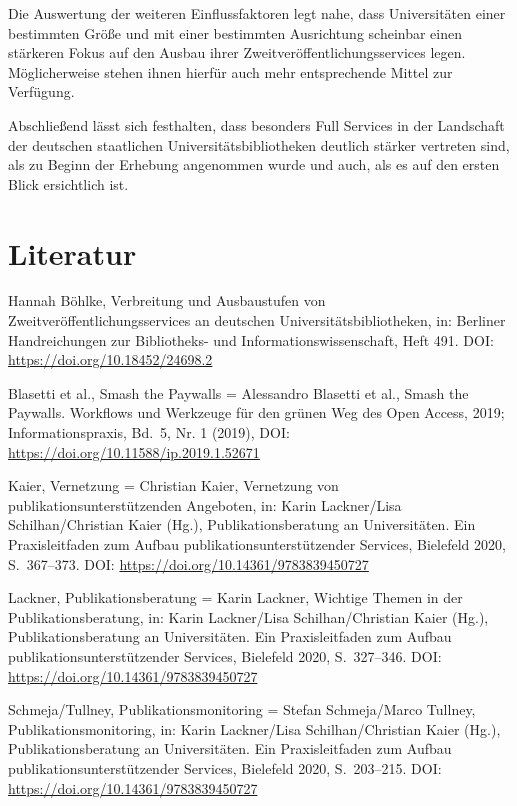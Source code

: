\documentclass[a4paper,
fontsize=11pt,
oneside,
numbers=noperiodatend,
parskip=half-,
bibliography=totoc,
final
]{scrartcl}
\begin{document}
Die Auswertung der weiteren Einflussfaktoren legt nahe, dass
Universitäten einer bestimmten Größe und mit einer bestimmten
Ausrichtung scheinbar einen stärkeren Fokus auf den Ausbau ihrer
Zweitveröffentlichungsservices legen. Möglicherweise stehen ihnen
hierfür auch mehr entsprechende Mittel zur Verfügung.

Abschließend lässt sich festhalten, dass besonders Full Services in der
Landschaft der deutschen staatlichen Universitätsbibliotheken deutlich
stärker vertreten sind, als zu Beginn der Erhebung angenommen wurde und
auch, als es auf den ersten Blick ersichtlich ist.

\hypertarget{literatur}{%
\section{Literatur}\label{literatur}}

Hannah Böhlke, Verbreitung und Ausbaustufen von
Zweitveröffentlichungsservices an deutschen Universitätsbibliotheken,
in: Berliner Handreichungen zur Bibliotheks- und
Informationswissenschaft, Heft 491. DOI:
\url{https://doi.org/10.18452/24698.2}

Blasetti et al., Smash the Paywalls = Alessandro Blasetti et al., Smash
the Paywalls. Workflows und Werkzeuge für den grünen Weg des Open
Access, 2019; Informationspraxis, Bd.~5, Nr. 1 (2019), DOI:
\url{https://doi.org/10.11588/ip.2019.1.52671}

Kaier, Vernetzung = Christian Kaier, Vernetzung von
publikationsunterstützenden Angeboten, in: Karin Lackner/Lisa
Schilhan/Christian Kaier (Hg.), Publikationsberatung an Universitäten.
Ein Praxisleitfaden zum Aufbau publikationsunterstützender Services,
Bielefeld 2020, S.~367--373. DOI:
\url{https://doi.org/10.14361/9783839450727}

Lackner, Publikationsberatung = Karin Lackner, Wichtige Themen in der
Publikationsberatung, in: Karin Lackner/Lisa Schilhan/Christian Kaier
(Hg.), Publikationsberatung an Universitäten. Ein Praxisleitfaden zum
Aufbau publikationsunterstützender Services, Bielefeld 2020,
S.~327--346. DOI: \url{https://doi.org/10.14361/9783839450727}

Schmeja/Tullney, Publikationsmonitoring = Stefan Schmeja/Marco Tullney,
Publikationsmonitoring, in: Karin Lackner/Lisa Schilhan/Christian Kaier
(Hg.), Publikationsberatung an Universitäten. Ein Praxisleitfaden zum
Aufbau publikationsunterstützender Services, Bielefeld 2020,
S.~203--215. DOI: \url{https://doi.org/10.14361/9783839450727}
\end{document}
